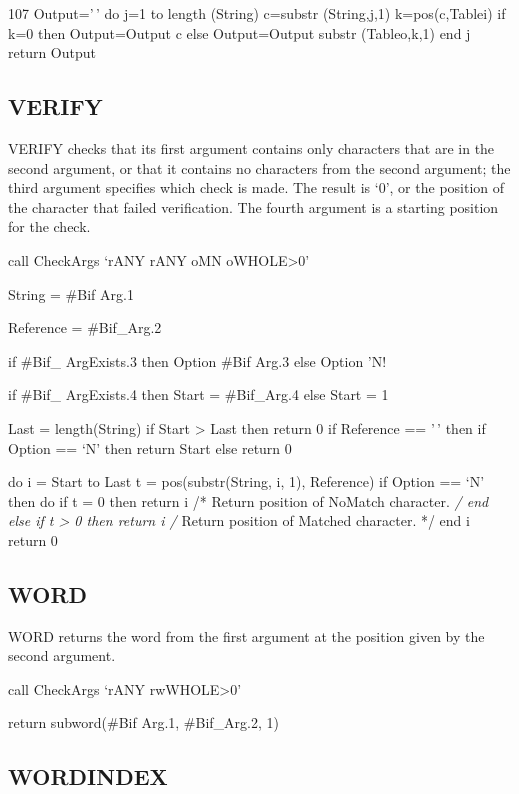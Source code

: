 107 Output='\,' do j=1 to length (String) c=substr (String,j,1)
k=pos(c,Tablei) if k=0 then Output=Output \textbar\textbar c else
Output=Output \textbar{} \textbar{} substr (Tableo,k,1) end j return
Output

\hypertarget{verify}{%
\subsection{VERIFY}\label{verify}}

VERIFY checks that its first argument contains only characters that are
in the second argument, or that it contains no characters from the
second argument; the third argument specifies which check is made. The
result is `0', or the position of the character that failed
verification. The fourth argument is a starting position for the check.

call CheckArgs `rANY rANY oMN oWHOLE\textgreater0'

String = \#Bif Arg.1

Reference = \#Bif\_Arg.2

if \#Bif\_ ArgExists.3 then Option \#Bif Arg.3 else Option 'N!

if \#Bif\_ ArgExists.4 then Start = \#Bif\_Arg.4 else Start = 1

Last = length(String) if Start \textgreater{} Last then return 0 if
Reference == '\,' then if Option == `N' then return Start else return 0

do i = Start to Last t = pos(substr(String, i, 1), Reference) if Option
== `N' then do if t = 0 then return i /* Return position of NoMatch
character. \emph{/ end else if t \textgreater{} 0 then return i /}
Return position of Matched character. */ end i return 0

\hypertarget{word}{%
\subsection{WORD}\label{word}}

WORD returns the word from the first argument at the position given by
the second argument.

call CheckArgs `rANY rwWHOLE\textgreater0'

return subword(\#Bif Arg.1, \#Bif\_Arg.2, 1)

\hypertarget{wordindex}{%
\subsection{WORDINDEX}\label{wordindex}}

